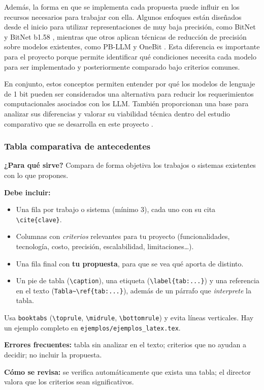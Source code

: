 Además, la forma en que se implementa cada propuesta puede influir en los recursos necesarios para trabajar con ella. Algunos enfoques están diseñados desde el inicio para utilizar representaciones de muy baja precisión, como BitNet y BitNet b1.58 \cite{bitnet2023,bitnet1582024}, mientras que otros aplican técnicas de reducción de precisión sobre modelos existentes, como PB-LLM y OneBit \cite{pbllm2024,onebit2024}. Esta diferencia es importante para el proyecto porque permite identificar qué condiciones necesita cada modelo para ser implementado y posteriormente comparado bajo criterios comunes.

En conjunto, estos conceptos permiten entender por qué los modelos de lenguaje de 1 bit pueden ser considerados una alternativa para reducir los requerimientos computacionales asociados con los LLM. También proporcionan una base para analizar sus diferencias y valorar su viabilidad técnica dentro del estudio comparativo que se desarrolla en este proyecto \cite{bitnet2023,bitnet1582024,pbllm2024,onebit2024}.

\subsubsection{Tabla comparativa de antecedentes} \label{subsec:tabla_comparativa_antecedentes} %

\begin{guia}
\textbf{¿Para qué sirve?} Compara de forma objetiva los trabajos o sistemas existentes con lo que propones.

\textbf{Debe incluir:}
\begin{itemize}[nosep,leftmargin=*]
  \item Una fila por trabajo o sistema (mínimo 3), cada uno con su cita \verb|\cite{clave}|.
  \item Columnas con \emph{criterios} relevantes para tu proyecto (funcionalidades, tecnología, costo, precisión,
        escalabilidad, limitaciones\ldots).
  \item Una fila final con \textbf{tu propuesta}, para que se vea qué aporta de distinto.
  \item Un pie de tabla (\verb|\caption|), una etiqueta (\verb|\label{tab:...}|) y una referencia en el texto
        (\verb|Tabla~\ref{tab:...}|), además de un párrafo que \emph{interprete} la tabla.
\end{itemize}
Usa \verb|booktabs| (\verb|\toprule|, \verb|\midrule|, \verb|\bottomrule|) y evita líneas verticales. Hay un ejemplo
completo en \texttt{ejemplos/ejemplos\_latex.tex}.

\textbf{Errores frecuentes:} tabla sin analizar en el texto; criterios que no ayudan a decidir; no incluir la propuesta.

\textbf{Cómo se revisa:} se verifica automáticamente que exista una tabla; el director valora que los criterios sean
significativos.
\end{guia}

